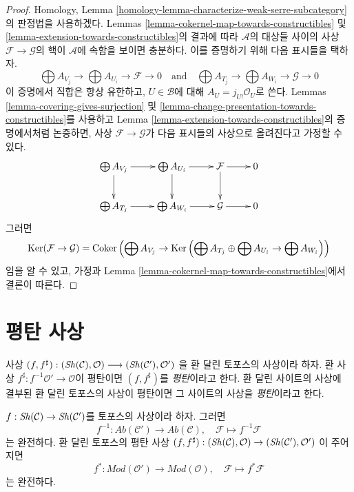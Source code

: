\begin{proof}
Homology, Lemma \ref{homology-lemma-characterize-weak-serre-subcategory}의
판정법을 사용하겠다. Lemmas
\ref{lemma-cokernel-map-towards-constructibles} 및
\ref{lemma-extension-towards-constructibles}의 결과에 따라
$\mathcal{A}$의 대상들 사이의 사상 $\mathcal{F} \to \mathcal{G}$의 핵이
$\mathcal{A}$에 속함을 보이면 충분하다. 이를 증명하기 위해 다음 표시들을
택하자.
$$
\bigoplus A_{V_j} \to \bigoplus A_{U_i} \to \mathcal{F} \to 0
\quad\text{and}\quad
\bigoplus A_{T_j} \to \bigoplus A_{W_i} \to \mathcal{G} \to 0
$$
이 증명에서 직합은 항상 유한하고, $U \in \mathcal{B}$에 대해
$A_U = j_{U!}\mathcal{O}_U$로 쓴다. Lemmas
\ref{lemma-covering-gives-surjection} 및
\ref{lemma-change-presentation-towards-constructibles}를 사용하고 Lemma
\ref{lemma-extension-towards-constructibles}의 증명에서처럼 논증하면, 사상
$\mathcal{F} \to \mathcal{G}$가 다음 표시들의 사상으로 올려진다고 가정할
수 있다.
$$
\xymatrix{
\bigoplus A_{V_j} \ar[r] \ar[d] &
\bigoplus A_{U_i} \ar[r] \ar[d] &
\mathcal{F} \ar[r] \ar[d] & 0 \\
\bigoplus A_{T_j} \ar[r] &
\bigoplus A_{W_i} \ar[r] &
\mathcal{G} \ar[r] & 0
}
$$
그러면
$$
\mathop{\mathrm{Ker}}(\mathcal{F} \to \mathcal{G}) =
\mathop{\mathrm{Coker}}\left(\bigoplus A_{V_j} \to
\mathop{\mathrm{Ker}}\left(
\bigoplus A_{T_j} \oplus \bigoplus A_{U_i} \to \bigoplus A_{W_i}\right)\right)
$$
임을 알 수 있고, 가정과 Lemma
\ref{lemma-cokernel-map-towards-constructibles}에서 결론이 따른다.
\end{proof}








\section{평탄 사상}
\label{section-flat-morphisms}

\begin{definition}
\label{definition-flat-morphism}
사상
$(f, f^\sharp) :
(\mathop{\mathit{Sh}}\nolimits(\mathcal{C}), \mathcal{O})
\longrightarrow
(\mathop{\mathit{Sh}}\nolimits(\mathcal{C}'), \mathcal{O}')$
을 환 달린 토포스의 사상이라 하자. 환 사상
$f^\sharp : f^{-1}\mathcal{O}' \to \mathcal{O}$이 평탄이면
$(f, f^\sharp)$를 {\it 평탄}이라고 한다. 환 달린 사이트의 사상에 결부된
환 달린 토포스의 사상이 평탄이면 그 사이트의 사상을 {\it 평탄}이라고 한다.
\end{definition}

\begin{lemma}
\label{lemma-flat-pullback-exact}
$f : \mathop{\mathit{Sh}}\nolimits(\mathcal{C}) \to \mathop{\mathit{Sh}}\nolimits(\mathcal{C}')$를 토포스의 사상이라 하자.
그러면
$$
f^{-1} : \textit{Ab}(\mathcal{C}') \longrightarrow \textit{Ab}(\mathcal{C}),
\quad
\mathcal{F} \longmapsto f^{-1}\mathcal{F}
$$
는 완전하다. 환 달린 토포스의 평탄 사상
$(f, f^\sharp) :
(\mathop{\mathit{Sh}}\nolimits(\mathcal{C}), \mathcal{O})
\to
(\mathop{\mathit{Sh}}\nolimits(\mathcal{C}'), \mathcal{O}')$
이 주어지면
$$
f^* : \textit{Mod}(\mathcal{O}') \longrightarrow \textit{Mod}(\mathcal{O}),
\quad
\mathcal{F} \longmapsto f^*\mathcal{F}
$$
는 완전하다.
\end{lemma}

